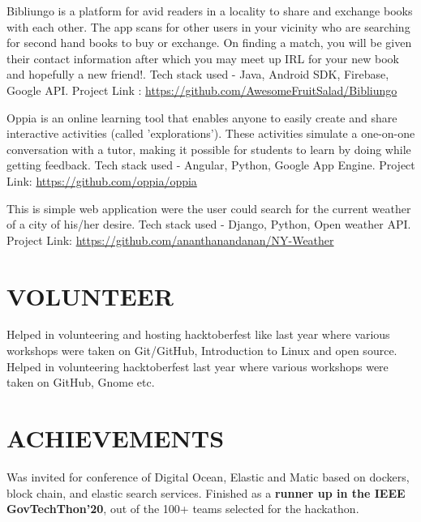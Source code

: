 \documentclass[11pt,a4paper,sans]{moderncv}        %
\begin{document}
{Bibliungo is a platform for avid readers in a locality to share and exchange books with each other. The app scans for other users in your vicinity who are searching for second hand books to buy or exchange. On finding a match, you will be given their contact information after which you may meet up IRL for your new book and hopefully a new friend!. Tech stack used - Java, Android SDK, Firebase, Google API.
Project Link : {\newline}
\url{https://github.com/AwesomeFruitSalad/Bibliungo}}

{Oppia is an online learning tool that enables anyone to easily create and share interactive activities (called 'explorations'). These activities simulate a one-on-one conversation with a tutor, making it possible for students to learn by doing while getting feedback. Tech stack used - Angular, Python, Google App Engine. Project Link: {\newline}
\url{https://github.com/oppia/oppia}}{}

{This is simple web application were the user could search for the current weather of a city of his/her desire. Tech stack used - Django, Python, Open weather API. Project Link: {\newline}
\url{https://github.com/ananthanandanan/NY-Weather}}{}



\section{VOLUNTEER}
{Helped in volunteering and hosting hacktoberfest like last year where various workshops were taken on Git/GitHub, Introduction to Linux and open source.}
{Helped in volunteering  hacktoberfest last year where various workshops were taken on GitHub, Gnome etc. }


\section{ACHIEVEMENTS}
{Was invited for conference of Digital Ocean, Elastic and Matic based on dockers, block chain, and elastic search services. }
{Finished as a \textbf{runner up in the IEEE GovTechThon'20}, out of the 100+ teams selected for the hackathon. }
\end{document}
